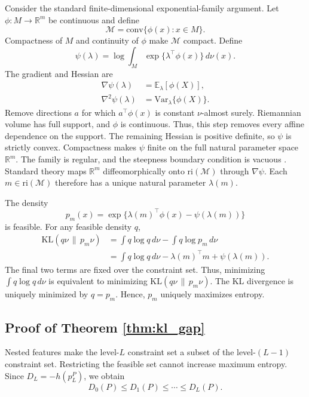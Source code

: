 \documentclass[twoside]{article}
\theoremstyle{definition}
\theoremstyle{remark}
\newcommand{\M}{\mathcal M}
\newcommand{\E}{\mathbb E}
\newcommand{\R}{\mathbb R}
\newcommand{\KL}{\mathrm{KL}}
\newcommand{\ri}{\mathrm{ri}}
\newcommand{\conv}{\mathrm{conv}}
\begin{document}
Consider the standard finite-dimensional exponential-family argument. Let $\phi:M\to\R^m$ be continuous and define
\[
  \M=\conv\{\phi(x):x\in M\}.
\]
Compactness of $M$ and continuity of $\phi$ make $\M$ compact. Define
\[
  \psi(\lambda)=\log\int_M \exp\{\lambda^\top\phi(x)\}\,d\nu(x).
\]
The gradient and Hessian are
\begin{align*}
  \nabla\psi(\lambda)&=\E_\lambda[\phi(X)],\\
  \nabla^2\psi(\lambda)&=\mathrm{Var}_\lambda\{\phi(X)\}.
\end{align*}
Remove directions $a$ for which $a^\top\phi(x)$ is constant $\nu$-almost surely. Riemannian volume has full support, and $\phi$ is continuous. Thus, this step removes every affine dependence on the support. The remaining Hessian is positive definite, so $\psi$ is strictly convex. Compactness makes $\psi$ finite on the full natural parameter space $\R^m$. The family is regular, and the steepness boundary condition is vacuous \citep{brown_1986_FundamentalsStatisticalExponential}. Standard theory maps $\R^m$ diffeomorphically onto $\ri(\M)$ through $\nabla\psi$. Each $m\in\ri(\M)$ therefore has a unique natural parameter $\lambda(m)$.

The density
\[
  p_m(x)=\exp\{\lambda(m)^\top\phi(x)-\psi(\lambda(m))\}
\]
is feasible. For any feasible density $q$,
\begin{align*}
  \KL(q\nu\,\|\,p_m\nu)
  &=\int q\log q\,d\nu-\int q\log p_m\,d\nu\\
  &=\int q\log q\,d\nu-
  \lambda(m)^\top m+\psi(\lambda(m)).
\end{align*}
The final two terms are fixed over the constraint set. Thus, minimizing $\int q\log q\,d\nu$ is equivalent to minimizing $\KL(q\nu\,\|\,p_m\nu)$. The KL divergence is uniquely minimized by $q=p_m$. Hence, $p_m$ uniquely maximizes entropy.

\subsection{Proof of Theorem \ref{thm:kl_gap}}

Nested features make the level-$L$ constraint set a subset of the level-$(L-1)$ constraint set. Restricting the feasible set cannot increase maximum entropy. Since $D_L=-h(p_L^P)$, we obtain
\[
  D_0(P)\le D_1(P)\le\cdots\le D_L(P).
\]
\end{document}
